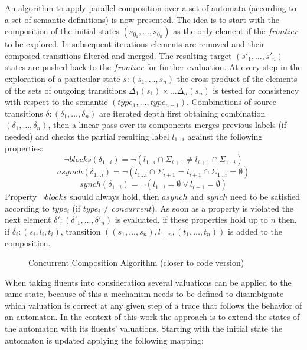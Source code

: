 %		 
An algorithm to apply parallel composition over a set of automata (according to a set of semantic definitions) is now presented.  The idea is to start with the composition of the initial states $(s_{0_1},\ldots,s_{0_n})$ as the only element if the $frontier$ to be explored. In subsequent iterations elements are removed and their composed transitions filtered and merged. The resulting target $(s'_1,\ldots,s'_n)$ states are pushed back to the $frontier$ for further evaluation. At every step in the exploration of a particular state $s:(s_1,\ldots,s_n)$ the cross product of the elements of the sets of outgoing transitions $\Delta_1(s_1) \times \ldots \Delta_n(s_n)$ is tested for consistency with respect to the  semantic $(type_1,\ldots,type_{n-1})$. Combinations of source transitions $\delta:(\delta_1,\ldots,\delta_n)$ are iterated depth first obtaining combination $(\delta_1,\ldots,\delta_n)$, then a linear pass over its components merges previous labels (if needed) and checks the partial resulting label $l_{1\ldots i}$  against the following properties:
\[\neg blocks(\delta_{1\ldots i})= \neg(l_{1\ldots i}\cap \Sigma_{i+1} \neq l_{i+1} \cap \Sigma_{1\ldots i}) \]
\[asynch(\delta_{1\ldots i})= \neg (l_{1\ldots i}\cap \Sigma_{i+1} = l_{i+1} \cap \Sigma_{1\ldots i}=\emptyset) \]
\[synch(\delta_{1\ldots i})= \neg (l_{1\ldots i}=\emptyset \vee l_{i+1} =\emptyset) \]
Property $\neg blocks$ should always hold, then $asynch$ and $synch$ need to be satisfied according to $type_i$ (if $type_i \neq concurrent$). As soon as a property is violated the next element $\delta':(\delta'_1,\ldots,\delta'_n)$ is evaluated, if these properties hold up to $n$ then, if $\delta_{i}:(s_i,l_i,t_i)$, transition
$((s_1,\ldots,s_n),l_{1\ldots n},(t_1,\ldots,t_n))$ is added to the composition.


\begin{figure}[ht]
	\begin{center}
		 
		\caption{Concurrent Composition Algorithm (closer to code version)}
		\label{fig:dfs-code2}
	\end{center}
\end{figure}

When taking fluents into consideration several valuations can be applied to the same state, because of this a mechanism needs to be defined to disambiguate which valuation is correct at any given step of a trace that follows the behavior of an automaton.
In the context of this work the approach is to extend the states of the automaton with its fluents' valuations. Starting with the initial state the automaton is updated applying the following mapping:

